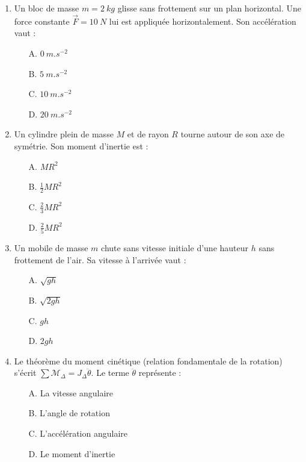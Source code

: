 \documentclass[11pt]{article}
\begin{document}
\begin{exercice}
\begin{enumerate}
    \item Un bloc de masse $m = \SI{2}{kg}$ glisse sans frottement sur un plan horizontal. Une force constante $\vec{F} = \SI{10}{N}$ lui est appliquée horizontalement. Son accélération vaut :
    \begin{itemize}
        \item[A.] $\SI{0}{m.s^{-2}}$
        \item[B.] $\SI{5}{m.s^{-2}}$
        \item[C.] $\SI{10}{m.s^{-2}}$
        \item[D.] $\SI{20}{m.s^{-2}}$
    \end{itemize}
    \item Un cylindre plein de masse $M$ et de rayon $R$ tourne autour de son axe de symétrie. Son moment d'inertie est :
    \begin{itemize}
        \item[A.] $MR^2$
        \item[B.] $\frac{1}{2}MR^2$
        \item[C.] $\frac{2}{3}MR^2$
        \item[D.] $\frac{2}{5}MR^2$
    \end{itemize}
    \item Un mobile de masse $m$ chute sans vitesse initiale d'une hauteur $h$ sans frottement de l'air. Sa vitesse à l'arrivée vaut :
    \begin{itemize}
        \item[A.] $\sqrt{gh}$
        \item[B.] $\sqrt{2gh}$
        \item[C.] $gh$
        \item[D.] $2gh$
    \end{itemize}
    \item Le théorème du moment cinétique (relation fondamentale de la rotation) s'écrit $\sum \mathcal{M}_{\Delta} = J_{\Delta} \ddot{\theta}$. Le terme $\ddot{\theta}$ représente :
    \begin{itemize}
        \item[A.] La vitesse angulaire
        \item[B.] L'angle de rotation
        \item[C.] L'accélération angulaire
        \item[D.] Le moment d'inertie
    \end{itemize}
\end{enumerate}
\end{exercice}
\end{document}
